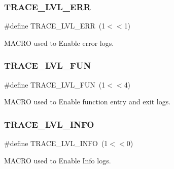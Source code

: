 \subsubsection{\texorpdfstring{TRACE\_LVL\_ERR}{TRACE\_LVL\_ERR}}
{\footnotesize\ttfamily \#define T\+R\+A\+C\+E\+\_\+\+L\+V\+L\+\_\+\+E\+RR~(1$<$$<$1)}



M\+A\+C\+RO used to Enable error logs. 

\mbox{\label{group__dbg__logs__group__macros_ga6c483b2388f6352f68b9a9be81474a74}} 
\subsubsection{\texorpdfstring{TRACE\_LVL\_FUN}{TRACE\_LVL\_FUN}}
{\footnotesize\ttfamily \#define T\+R\+A\+C\+E\+\_\+\+L\+V\+L\+\_\+\+F\+UN~(1$<$$<$4)}



M\+A\+C\+RO used to Enable function entry and exit logs. 

\mbox{\label{group__dbg__logs__group__macros_ga0d0272a070477f118748192f15de8bbd}} 
\subsubsection{\texorpdfstring{TRACE\_LVL\_INFO}{TRACE\_LVL\_INFO}}
{\footnotesize\ttfamily \#define T\+R\+A\+C\+E\+\_\+\+L\+V\+L\+\_\+\+I\+N\+FO~(1$<$$<$0)}



M\+A\+C\+RO used to Enable Info logs. 

